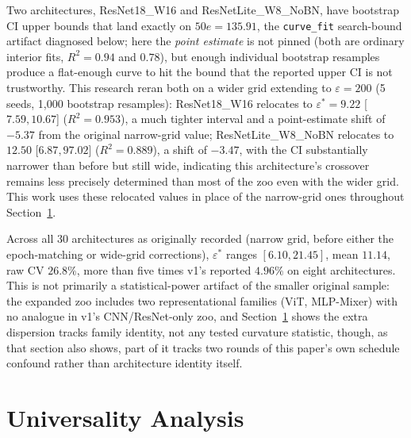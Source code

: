 \documentclass[11pt]{article}
\newcommand{\eps}{\varepsilon}
\newcommand{\epsstar}{\eps^{*}}
\begin{document}
Two architectures, ResNet18\_W16 and ResNetLite\_W8\_NoBN, have bootstrap
CI upper bounds that land exactly on $50e=135.91$, the \texttt{curve\_fit}
search-bound artifact diagnosed below; here the
\emph{point estimate} is not pinned (both are ordinary interior fits,
$R^2=0.94$ and $0.78$), but enough individual bootstrap resamples produce a
flat-enough curve to hit the bound that the reported upper CI is not
trustworthy. This research reran both on a wider grid extending to $\eps=200$ (5
seeds, 1{,}000 bootstrap resamples): ResNet18\_W16 relocates to
$\epsstar=9.22$ [$7.59,10.67$] ($R^2=0.953$), a much tighter interval and a
point-estimate shift of $-5.37$ from the original narrow-grid value;
ResNetLite\_W8\_NoBN relocates to $12.50$ [$6.87,97.02$] ($R^2=0.889$), a
shift of $-3.47$, with the CI substantially narrower than before but still
wide, indicating this architecture's crossover remains less precisely
determined than most of the zoo even with the wider grid. This work uses these
relocated values in place of the narrow-grid ones throughout
Section~\ref{sec:universality}.

Across all 30 architectures as originally recorded (narrow grid, before
either the epoch-matching or wide-grid corrections), $\epsstar$ ranges
$[6.10, 21.45]$, mean $11.14$, raw CV $26.8\%$, more than five times v1's
reported $4.96\%$ on eight architectures. This is not primarily a
statistical-power artifact of the smaller original sample: the expanded
zoo includes two representational families (ViT, MLP-Mixer) with no
analogue in v1's CNN/ResNet-only zoo, and Section~\ref{sec:universality}
shows the extra dispersion tracks family identity, not any tested
curvature statistic, though, as that section also shows, part of it
tracks two rounds of this paper's own schedule confound rather than architecture
identity itself.

\section{Universality Analysis}
\label{sec:universality}
\end{document}
